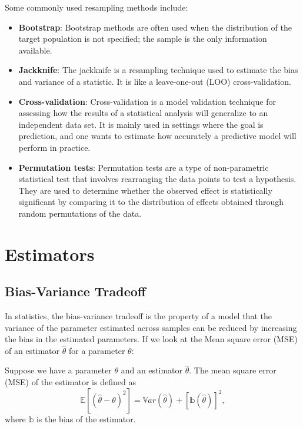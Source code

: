 \documentclass[
  letterpaper,
  DIV=11,
  numbers=noendperiod]{scrreprt}
\begin{document}
Some commonly used resampling methods include:

\begin{itemize}
\item
  \textbf{Bootstrap}: Bootstrap methods are often used when the
  distribution of the target population is not specified; the sample is
  the only information available.
\item
  \textbf{Jackknife}: The jackknife is a resampling technique used to
  estimate the bias and variance of a statistic. It is like a
  leave-one-out (LOO) cross-validation.
\item
  \textbf{Cross-validation}: Cross-validation is a model validation
  technique for assessing how the results of a statistical analysis will
  generalize to an independent data set. It is mainly used in settings
  where the goal is prediction, and one wants to estimate how accurately
  a predictive model will perform in practice.
\item
  \textbf{Permutation tests}: Permutation tests are a type of
  non-parametric statistical test that involves rearranging the data
  points to test a hypothesis. They are used to determine whether the
  observed effect is statistically significant by comparing it to the
  distribution of effects obtained through random permutations of the
  data.
\end{itemize}

\section{Estimators}\label{estimators}

\subsection{Bias-Variance Tradeoff}\label{bias-variance-tradeoff}

In statistics, the bias-variance tradeoff is the property of a model
that the variance of the parameter estimated across samples can be
reduced by increasing the bias in the estimated parameters. If we look
at the Mean square error (MSE) of an estimator \(\hat{\theta}\) for a
parameter \(\theta\):

Suppose we have a parameter \(\theta\) and an estimator
\(\hat{\theta}\). The mean square error (MSE) of the estimator is
defined as
\[\mathbb{E}[(\hat{\theta}-\theta )^2 ]= \mathbb{V}ar(\hat{\theta}) + [\mathbb b(\hat{\theta})]^2,\]
where \(\mathbb b\) is the bias of the estimator.
\end{document}
